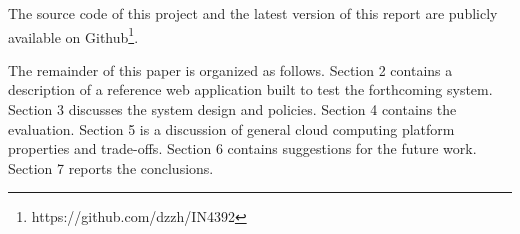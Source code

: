 \documentclass[conference]{IEEEtran}
\begin{document}
The source code of this project and the latest version of this report are publicly available on Github\footnote{https://github.com/dzzh/IN4392}.

The remainder of this paper is organized as follows. Section 2 contains a description of a reference web application built to test the forthcoming system. Section 3 discusses the system design and policies. Section 4 contains the evaluation. Section 5 is a discussion of general cloud computing platform properties and trade-offs. Section 6 contains suggestions for the future work. Section 7 reports the conclusions.

%
%



%
%
\end{document}
